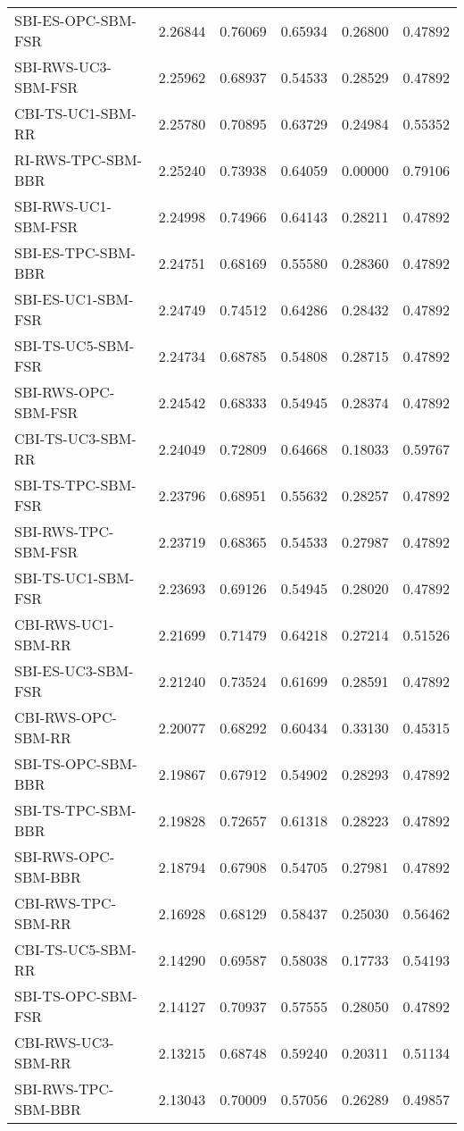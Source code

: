 \begin{tabular}{lrrrrr}
SBI-ES-OPC-SBM-FSR & 2.26844 & 0.76069 & 0.65934 & 0.26800 & 0.47892 \\
SBI-RWS-UC3-SBM-FSR & 2.25962 & 0.68937 & 0.54533 & 0.28529 & 0.47892 \\
CBI-TS-UC1-SBM-RR & 2.25780 & 0.70895 & 0.63729 & 0.24984 & 0.55352 \\
RI-RWS-TPC-SBM-BBR & 2.25240 & 0.73938 & 0.64059 & 0.00000 & 0.79106 \\
SBI-RWS-UC1-SBM-FSR & 2.24998 & 0.74966 & 0.64143 & 0.28211 & 0.47892 \\
SBI-ES-TPC-SBM-BBR & 2.24751 & 0.68169 & 0.55580 & 0.28360 & 0.47892 \\
SBI-ES-UC1-SBM-FSR & 2.24749 & 0.74512 & 0.64286 & 0.28432 & 0.47892 \\
SBI-TS-UC5-SBM-FSR & 2.24734 & 0.68785 & 0.54808 & 0.28715 & 0.47892 \\
SBI-RWS-OPC-SBM-FSR & 2.24542 & 0.68333 & 0.54945 & 0.28374 & 0.47892 \\
CBI-TS-UC3-SBM-RR & 2.24049 & 0.72809 & 0.64668 & 0.18033 & 0.59767 \\
SBI-TS-TPC-SBM-FSR & 2.23796 & 0.68951 & 0.55632 & 0.28257 & 0.47892 \\
SBI-RWS-TPC-SBM-FSR & 2.23719 & 0.68365 & 0.54533 & 0.27987 & 0.47892 \\
SBI-TS-UC1-SBM-FSR & 2.23693 & 0.69126 & 0.54945 & 0.28020 & 0.47892 \\
CBI-RWS-UC1-SBM-RR & 2.21699 & 0.71479 & 0.64218 & 0.27214 & 0.51526 \\
SBI-ES-UC3-SBM-FSR & 2.21240 & 0.73524 & 0.61699 & 0.28591 & 0.47892 \\
CBI-RWS-OPC-SBM-RR & 2.20077 & 0.68292 & 0.60434 & 0.33130 & 0.45315 \\
SBI-TS-OPC-SBM-BBR & 2.19867 & 0.67912 & 0.54902 & 0.28293 & 0.47892 \\
SBI-TS-TPC-SBM-BBR & 2.19828 & 0.72657 & 0.61318 & 0.28223 & 0.47892 \\
SBI-RWS-OPC-SBM-BBR & 2.18794 & 0.67908 & 0.54705 & 0.27981 & 0.47892 \\
CBI-RWS-TPC-SBM-RR & 2.16928 & 0.68129 & 0.58437 & 0.25030 & 0.56462 \\
CBI-TS-UC5-SBM-RR & 2.14290 & 0.69587 & 0.58038 & 0.17733 & 0.54193 \\
SBI-TS-OPC-SBM-FSR & 2.14127 & 0.70937 & 0.57555 & 0.28050 & 0.47892 \\
CBI-RWS-UC3-SBM-RR & 2.13215 & 0.68748 & 0.59240 & 0.20311 & 0.51134 \\
SBI-RWS-TPC-SBM-BBR & 2.13043 & 0.70009 & 0.57056 & 0.26289 & 0.49857 \\

\end{tabular}

